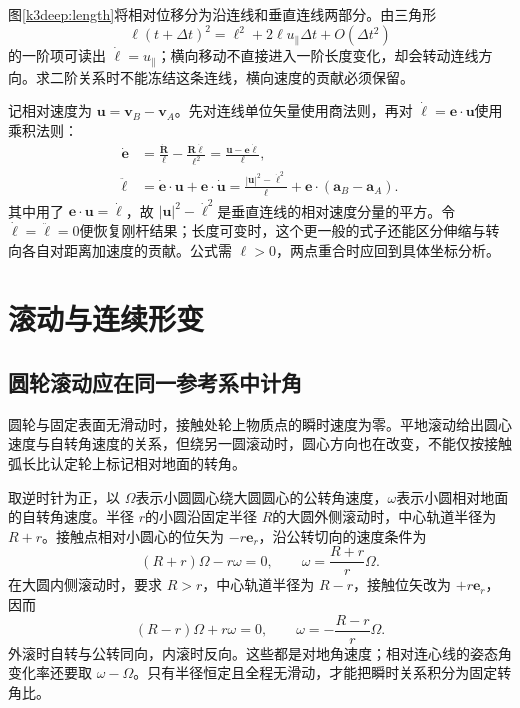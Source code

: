 图\ref{k3deep:length}将相对位移分为沿连线和垂直连线两部分。由三角形
\[\ell(t+\Delta t)^2=\ell^2+2\ell u_\parallel\Delta t+O(\Delta t^2)
\]
的一阶项可读出 $\dot\ell=u_\parallel$；横向移动不直接进入一阶长度变化，却会转动连线方向。求二阶关系时不能冻结这条连线，横向速度的贡献必须保留。

记相对速度为 $\bm u=\bm v_B-\bm v_A$。先对连线单位矢量使用商法则，再对 $\dot\ell=\bm e\cdot\bm u$使用乘积法则：
\begin{align*}
 \dot{\bm e}&=\frac{\dot{\bm R}}\ell-\frac{\bm R\dot\ell}{\ell^2}
 =\frac{\bm u-\bm e\dot\ell}{\ell},\\
 \ddot\ell&=\dot{\bm e}\cdot\bm u+\bm e\cdot\dot{\bm u}
 =\frac{|\bm u|^2-\dot\ell^2}{\ell}
   +\bm e\cdot(\bm a_B-\bm a_A).
\end{align*}
其中用了 $\bm e\cdot\bm u=\dot\ell$，故 $|\bm u|^2-\dot\ell^2$是垂直连线的相对速度分量的平方。令 $\dot\ell=\ddot\ell=0$便恢复刚杆结果；长度可变时，这个更一般的式子还能区分伸缩与转向各自对距离加速度的贡献。公式需 $\ell>0$，两点重合时应回到具体坐标分析。

\section{滚动与连续形变}
\subsection{圆轮滚动应在同一参考系中计角}
圆轮与固定表面无滑动时，接触处轮上物质点的瞬时速度为零。平地滚动给出圆心速度与自转角速度的关系，但绕另一圆滚动时，圆心方向也在改变，不能仅按接触弧长比认定轮上标记相对地面的转角。

取逆时针为正，以 $\Omega$表示小圆圆心绕大圆圆心的公转角速度，$\omega$表示小圆相对地面的自转角速度。半径 $r$的小圆沿固定半径 $R$的大圆外侧滚动时，中心轨道半径为 $R+r$。接触点相对小圆心的位矢为 $-r\bm e_r$，沿公转切向的速度条件为
\[
 (R+r)\Omega-r\omega=0,\qquad \omega=\frac{R+r}{r}\Omega.
\]
在大圆内侧滚动时，要求 $R>r$，中心轨道半径为 $R-r$，接触位矢改为 $+r\bm e_r$，因而
\[
 (R-r)\Omega+r\omega=0,\qquad \omega=-\frac{R-r}{r}\Omega.
\]
外滚时自转与公转同向，内滚时反向。这些都是对地角速度；相对连心线的姿态角变化率还要取 $\omega-\Omega$。只有半径恒定且全程无滑动，才能把瞬时关系积分为固定转角比。

